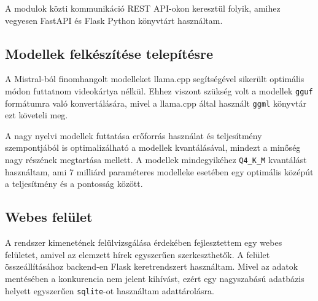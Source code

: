 A modulok közti kommunikáció REST API-okon keresztül folyik, amihez vegyesen FastAPI és Flask Python könyvtárt használtam.

\subsection{Modellek felkészítése telepítésre}

A Mistral-ból finomhangolt modelleket llama.cpp segítségével sikerült optimális módon futtatnom videokártya nélkül. Ehhez viszont szükség volt a modellek \texttt{gguf} formátumra való konvertálására, mivel a llama.cpp által használt \texttt{ggml} könyvtár ezt követeli meg.

A nagy nyelvi modellek futtatása erőforrás használat és teljesítmény szempontjából is optimalizálható a modellek kvantálásával, mindezt a minőség nagy részének megtartása mellett. A modellek mindegyikéhez \texttt{Q4\_K\_M} kvantálást használtam, ami 7 milliárd paraméteres modelleke esetében egy optimális középút a teljesítmény és a pontosság között.

\subsection{Webes felület}

A rendszer kimenetének felülvizsgálása érdekében fejlesztettem egy webes felületet, amivel az elemzett hírek egyszerűen szerkeszthetők. A felület összeállításához backend-en Flask keretrendszert használtam. Mivel az adatok mentésében a konkurencia nem jelent kihívást, ezért egy nagyszabású adatbázis helyett egyszerűen \texttt{sqlite}-ot használtam adattárolásra.

